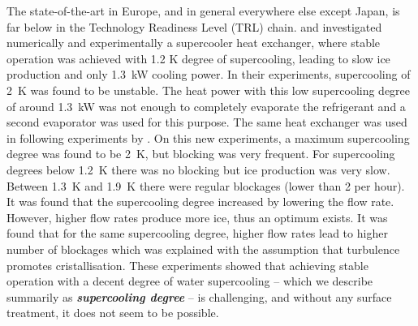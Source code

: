 The state-of-the-art in Europe, and in general everywhere else except Japan, is far below in the Technology Readiness Level (TRL) chain. 
\cite{castaing-lasvignottes_dynamic_2006} and \cite{bedecarrats_ice_2010} investigated numerically and experimentally a supercooler heat exchanger, where stable operation was achieved with 1.2 K degree of supercooling, leading to slow ice production and only 1.3~kW cooling power.
In their experiments, supercooling of 2~K was found to be unstable. The heat power with this low supercooling degree of around 1.3~kW was not enough to completely evaporate the refrigerant and a second evaporator was used for this purpose. %
The same heat exchanger was used in following experiments by \cite{bedecarrats_ice_2010}. On this new experiments, a maximum supercooling degree was found to be 2~K, but blocking was very frequent. For supercooling degrees below 1.2~K there was no blocking but ice production was very slow. Between 1.3~K and 1.9~K there were regular blockages (lower than 2 per hour).
It was found that the supercooling degree increased by lowering the flow rate. However, higher flow rates produce more ice, thus an optimum exists.
It was found that for the same supercooling degree, higher flow rates lead to higher number of blockages which was explained with the assumption that turbulence promotes cristallisation. 
These experiments showed that achieving stable operation with a decent degree of water supercooling -- which we describe summarily as \textbf{\em supercooling degree} -- is challenging, and without any surface treatment, it does not seem to be possible.



